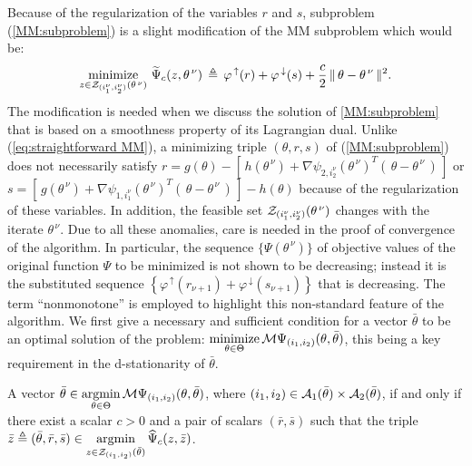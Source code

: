 \documentclass{siamart}
\newcommand{\wt}{\widetilde}
\newcommand{\wh}{\widehat}
\begin{document}
Because of the regularization of the variables $r$ and $s$, subproblem (\ref{MM:subproblem}) is a slight modification of the MM subproblem which would be:
\begin{equation} \label{eq:straightforward MM}
\displaystyle{
\operatornamewithlimits{\mbox{minimize}}_{z \in {\cal Z}_{(i_1^{\nu},i_2^{\nu})}(\theta^{\, \nu})}
} \ \wt{\Psi}_c%
(z,\theta^{\, \nu}) \, \triangleq \,
\varphi^{\, \uparrow}(r) + \varphi^{\, \downarrow}(s) +
\displaystyle{
\frac{c}{2}
} \, \| \, \theta - \theta^{\, \nu} \, \|^2.
\end{equation}
The modification is needed when we discuss the solution of \eqref{MM:subproblem} that is based on a smoothness property of its Lagrangian dual.  Unlike (\ref{eq:straightforward MM}), a minimizing triple $( \theta,r,s )$ of (\ref{MM:subproblem})
does not necessarily satisfy
$r = g(\theta) - \left[ \, h(\theta^{\, \nu}) + \nabla \psi_{2,i_2^{\nu}}(\theta^{\, \nu})^T \left( \, \theta - \theta^{\, \nu} \, \right) \, \right]$ or
$s = \left[ \, g(\theta^{\, \nu}) + \nabla \psi_{1,i_1^{\nu}}(\theta^{\, \nu})^T \left( \, \theta - \theta^{\, \nu} \, \right) \, \right] - h(\theta)$ because of
the regularization of these variables.  In addition, the feasible set ${\cal Z}_{(i_1^{\nu},i_2^{\nu})}(\theta^{\, \nu})$
changes with the iterate $\theta^{\, \nu}$.  Due to all these anomalies, care is needed in the proof of convergence of the algorithm. In particular, the sequence $\{ \Psi(\theta^{\, \nu}) \}$ of objective values of the original function $\Psi$ to be minimized is not shown
to be decreasing; instead it is the substituted sequence $\left\{ \varphi^{\, \uparrow}( r_{\nu+1} ) + \varphi^{\, \downarrow}( s_{\nu+1} ) \right\}$
that is decreasing.   The term ``nonmonotone'' is employed to highlight this non-standard feature of the algorithm. We first give a necessary and sufficient condition for a vector $\bar{\theta}$ to be an optimal solution of the problem: $\displaystyle{
\operatornamewithlimits{\mbox{minimize}}_{\theta \in \Theta}
} \, {\cal M}\Psi_{(i_1,i_2)}(\theta,\bar{\theta})$, this being a key requirement in the  d-stationarity
of $\bar{\theta}$.


\begin{lemma} \label{lm:regularized M}
A vector  $\bar{\theta} \in \displaystyle{
\operatornamewithlimits{\mbox{argmin}}_{\theta \in \Theta}
} \, {\cal M}\Psi_{(i_1,i_2)}(\theta,\bar{\theta})$, where $( i_1,i_2 ) \in {\cal A}_1(\bar{\theta}) \times {\cal A}_2(\bar{\theta})$,
if and only if there exist a scalar $c > 0$ and a pair of scalars $( \bar{r},\bar{s} )$
such that the triple $\bar{z} \triangleq ( \bar{\theta},\bar{r},\bar{s} ) \in \displaystyle{
\operatornamewithlimits{\mbox{argmin}}_{z \in {\cal Z}_{(i_1,i_2)}(\bar{\theta})}
} \, \wh{\Psi}_c%
(z,\bar{z})$.
\end{lemma}
\end{document}
